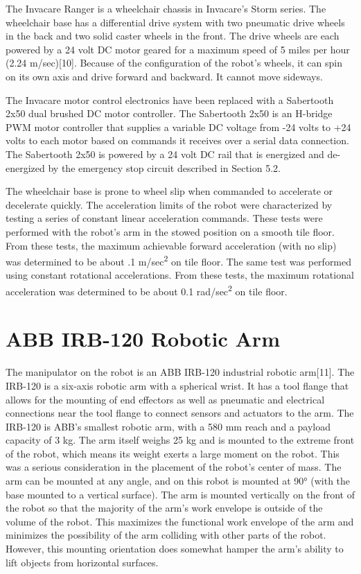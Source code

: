 \documentclass[]{cwru} %
\begin{document}
The Invacare Ranger is a wheelchair chassis in Invacare's Storm series.
The wheelchair base has a differential drive system with two pneumatic
drive wheels in the back and two solid caster wheels in the front. The
drive wheels are each powered by a 24 volt DC motor geared for a maximum
speed of 5 miles per hour (2.24 m/sec){[}10{]}. Because of the
configuration of the robot's wheels, it can spin on its own axis and
drive forward and backward. It cannot move sideways.

The Invacare motor control electronics have been replaced with a
Sabertooth 2x50 dual brushed DC motor controller. The Sabertooth 2x50 is
an H-bridge PWM motor controller that supplies a variable DC voltage
from -24 volts to +24 volts to each motor based on commands it receives
over a serial data connection. The Sabertooth 2x50 is powered by a 24
volt DC rail that is energized and de-energized by the emergency stop
circuit described in Section 5.2.

The wheelchair base is prone to wheel slip when commanded to accelerate
or decelerate quickly. The acceleration limits of the robot were
characterized by testing a series of constant linear acceleration
commands. These tests were performed with the robot's arm in the stowed
position on a smooth tile floor. From these tests, the maximum
achievable forward acceleration (with no slip) was determined to be
about .1 m/sec\textsuperscript{2} on tile floor. The same test was
performed using constant rotational accelerations. From these tests, the
maximum rotational acceleration was determined to be about 0.1
rad/sec\textsuperscript{2} on tile floor.

\section{ABB IRB-120 Robotic Arm}

The manipulator on the robot is an ABB IRB-120 industrial robotic
arm{[}11{]}. The IRB-120 is a six-axis robotic arm with a spherical
wrist. It has a tool flange that allows for the mounting of end
effectors as well as pneumatic and electrical connections near the tool
flange to connect sensors and actuators to the arm. The IRB-120 is ABB's
smallest robotic arm, with a 580 mm reach and a payload capacity of 3
kg. The arm itself weighs 25 kg and is mounted to the extreme front of
the robot, which means its weight exerts a large moment on the robot.
This was a serious consideration in the placement of the robot's center
of mass. The arm can be mounted at any angle, and on this robot is
mounted at 90° (with the base mounted to a vertical surface). The arm is
mounted vertically on the front of the robot so that the majority of the
arm's work envelope is outside of the volume of the robot. This
maximizes the functional work envelope of the arm and minimizes the
possibility of the arm colliding with other parts of the robot. However,
this mounting orientation does somewhat hamper the arm's ability to lift
objects from horizontal surfaces.
\end{document}
